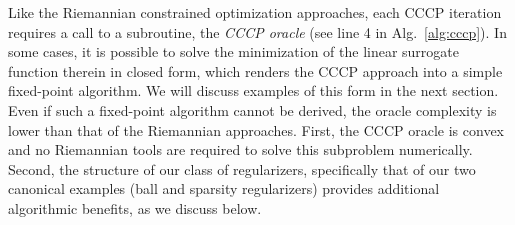 \documentclass[sn-nature]{sn-jnl}%
\theoremstyle{thmstyleone}%
\theoremstyle{thmstyletwo}%
\theoremstyle{thmstylethree}%
\begin{document}
Like the Riemannian constrained optimization approaches, each CCCP iteration requires a call to a subroutine, the \emph{CCCP oracle} (see line 4 in Alg.~\ref{alg:cccp}). In some cases, it is possible to solve the minimization of the linear surrogate function therein in closed form, which renders the CCCP approach into a simple fixed-point algorithm. We will discuss examples of this form in the next section. Even if such a fixed-point algorithm cannot be derived, the oracle complexity is lower than that of the Riemannian approaches. First, the CCCP oracle is convex and no Riemannian tools are required to solve this subproblem numerically. Second, the structure of our class of regularizers, specifically that of our two canonical examples (ball and sparsity regularizers) provides additional algorithmic benefits, as we discuss below.







\end{document}
